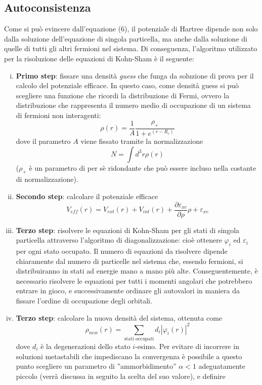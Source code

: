 \documentclass[11pt,a4paper]{article}
\begin{document}
\subsection{Autoconsistenza}
Come si può evincere dall'equazione (6), il potenziale di Hartree dipende non solo dalla soluzione dell'equazione di singola particella, ma anche dalla soluzione di quelle di tutti gli altri fermioni nel sistema. Di conseguenza, l'algoritmo utilizzato per la risoluzione delle equazioni di Kohn-Sham è il seguente:
\begin{enumerate}[i.]
\item \textbf{Primo step}: fissare una densità \emph{guess} che funga da soluzione di prova per il calcolo del potenziale efficace. In questo caso, come densità guess si può scegliere una funzione che ricordi la distribuzione di Fermi, ovvero la distribuzione che rappresenta il numero medio di occupazione di un sistema di fermioni non interagenti:
\begin{equation}\label{17}
\rho(r) = \frac{1}{A} \frac{\rho_+}{1+e^{(r-R_c)}}
\end{equation}
dove il parametro $A$ viene fissato tramite la normalizzazione
\[
N = \int d^3r \rho(r)
\]
($\rho_+$ è un parametro di per sè ridondante che può essere incluso nella costante di normalizzazione). 
\item \textbf{Secondo step}: calcolare il potenziale efficace
\[
V_{eff}(r) = V_{ext}(r)+V_{int}(r) + \frac{\partial \varepsilon_{xc}}{\partial \rho}\rho + \varepsilon_{xc}
\]
\item \textbf{Terzo step}: risolvere le equazioni di Kohn-Sham per gli stati di singola particella attraverso l'algoritmo di diagonalizzazione: cioè ottenere $\varphi_i$ ed $\varepsilon_i$ per ogni stato occupato. Il numero di equazioni da risolvere dipende chiaramente dal numero di particelle nel sistema che, essendo fermioni, si distribuiranno in stati ad energie mano a mano più alte. Conseguentemente, è necessario risolvere le equazioni per tutti i momenti angolari che potrebbero entrare in gioco, e successivamente ordinare gli autovalori in maniera da fissare l'ordine di occupazione degli orbitali. 
\item \textbf{Terzo step}: calcolare la nuova densità del sistema, ottenuta come
\begin{equation}
\rho_{new}(r) = \sum_{\text{stati occupati}} d_i|\varphi_i(r)|^2
\end{equation}
dove $d_i$ è la degenerazioni dello stato $i$-esimo. Per evitare di incorrere in soluzioni metastabili che impediscano la convergenza è possibile a questo punto scegliere un parametro di ''ammorbidimento'' $\alpha < 1$ adeguatamente piccolo (verrà discussa in seguito la scelta del suo valore), e definire

\end{enumerate}
\end{document}
